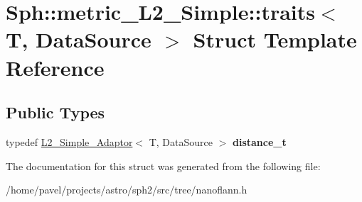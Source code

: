 \hypertarget{structSph_1_1metric__L2__Simple_1_1traits}{}\section{Sph\+:\+:metric\+\_\+\+L2\+\_\+\+Simple\+:\+:traits$<$ T, Data\+Source $>$ Struct Template Reference}
\label{structSph_1_1metric__L2__Simple_1_1traits}
\subsection*{Public Types}
\begin{DoxyCompactItemize}
\item 
\hypertarget{structSph_1_1metric__L2__Simple_1_1traits_a7f3c5f3c56fb3158667386343f6503e3}{}\label{structSph_1_1metric__L2__Simple_1_1traits_a7f3c5f3c56fb3158667386343f6503e3} 
typedef \hyperlink{structSph_1_1L2__Simple__Adaptor}{L2\+\_\+\+Simple\+\_\+\+Adaptor}$<$ T, Data\+Source $>$ {\bfseries distance\+\_\+t}
\end{DoxyCompactItemize}


The documentation for this struct was generated from the following file\+:\begin{DoxyCompactItemize}
\item 
/home/pavel/projects/astro/sph2/src/tree/nanoflann.\+h\end{DoxyCompactItemize}
